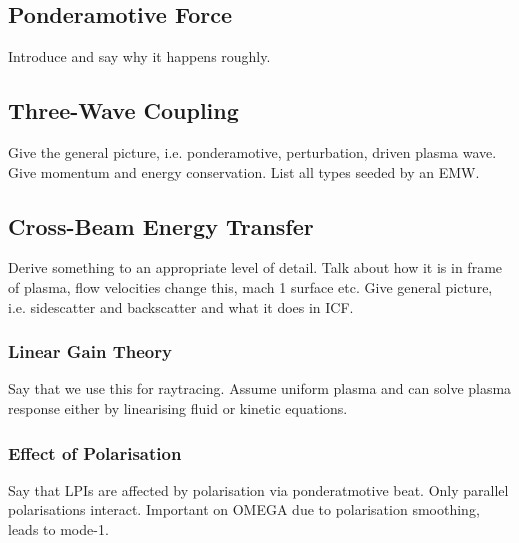 \subsection{Ponderamotive Force}%
\label{sec:theory_ponderamotive}

Introduce and say why it happens roughly.

\subsection{Three-Wave Coupling}%
\label{sec:theory_threewave}

Give the general picture, i.e. ponderamotive, perturbation, driven plasma wave.
Give momentum and energy conservation.
List all types seeded by an EMW.

\subsection{Cross-Beam Energy Transfer}%
\label{sec:theory_CBET}

Derive something to an appropriate level of detail.
Talk about how it is in frame of plasma, flow velocities change this, mach 1 surface etc.
Give general picture, i.e. sidescatter and backscatter and what it does in ICF.


\subsubsection{Linear Gain Theory}%
\label{sec:theory_lineargaincbet}

Say that we use this for raytracing.
Assume uniform plasma and can solve plasma response either by linearising fluid or kinetic equations.

\subsubsection{Effect of Polarisation}%
\label{sec:theory_cbet_polarisation}

Say that LPIs are affected by polarisation via ponderatmotive beat.
Only parallel polarisations interact.
Important on OMEGA due to polarisation smoothing, leads to mode-1.

